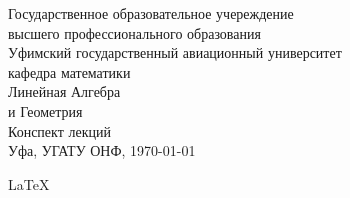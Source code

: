 \begin{titlepage} %
  \pagestyle{empty}
  \begin{center} %
    \large Государственное образовательное учереждение\\
    \large высшего профессионального образования\\
    \large Уфимский государственный авиационный университет\\[0.6cm]
    \large кафедра математики \\[2cm]

    \huge{Линейная Алгебра\\и Геометрия}\\[4cm] %
    \large Конспект лекций\\
    Уфа, УГАТУ ОНФ, {\large \today} %

    \vfill
    {\large \LaTeX} %
  \end{center} %
\end{titlepage} %
